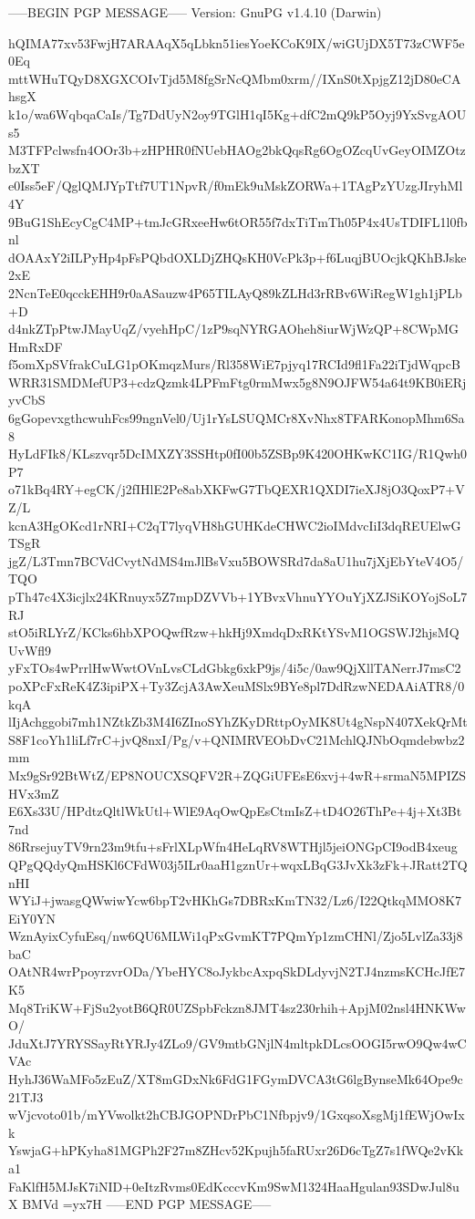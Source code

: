 -----BEGIN PGP MESSAGE-----
Version: GnuPG v1.4.10 (Darwin)

hQIMA77xv53FwjH7ARAAqX5qLbkn51iesYoeKCoK9IX/wiGUjDX5T73zCWF5e0Eq
mttWHuTQyD8XGXCOIvTjd5M8fgSrNcQMbm0xrm//IXnS0tXpjgZ12jD80eCAhsgX
k1o/wa6WqbqaCaIs/Tg7DdUyN2oy9TGlH1qI5Kg+dfC2mQ9kP5Oyj9YxSvgAOUs5
M3TFPclwsfn4OOr3b+zHPHR0fNUebHAOg2bkQqsRg6OgOZcqUvGeyOIMZOtzbzXT
e0Iss5eF/QglQMJYpTtf7UT1NpvR/f0mEk9uMskZORWa+1TAgPzYUzgJIryhMl4Y
9BuG1ShEcyCgC4MP+tmJcGRxeeHw6tOR55f7dxTiTmTh05P4x4UsTDIFL1l0fbnl
dOAAxY2iILPyHp4pFsPQbdOXLDjZHQsKH0VcPk3p+f6LuqjBUOcjkQKhBJske2xE
2NcnTeE0qcckEHH9r0aASauzw4P65TILAyQ89kZLHd3rRBv6WiRegW1gh1jPLb+D
d4nkZTpPtwJMayUqZ/vyehHpC/1zP9sqNYRGAOheh8iurWjWzQP+8CWpMGHmRxDF
f5omXpSVfrakCuLG1pOKmqzMurs/Rl358WiE7pjyq17RCId9fl1Fa22iTjdWqpcB
WRR31SMDMefUP3+cdzQzmk4LPFmFtg0rmMwx5g8N9OJFW54a64t9KB0iERjyvCbS
6gGopevxgthcwuhFcs99ngnVel0/Uj1rYsLSUQMCr8XvNhx8TFARKonopMhm6Sa8
HyLdFIk8/KLszvqr5DcIMXZY3SSHtp0fI00b5ZSBp9K420OHKwKC1IG/R1Qwh0P7
o71kBq4RY+egCK/j2fIHlE2Pe8abXKFwG7TbQEXR1QXDI7ieXJ8jO3QoxP7+VZ/L
kcnA3HgOKcd1rNRI+C2qT7lyqVH8hGUHKdeCHWC2ioIMdvcIiI3dqREUElwGTSgR
jgZ/L3Tmn7BCVdCvytNdMS4mJlBsVxu5BOWSRd7da8aU1hu7jXjEbYteV4O5/TQO
pTh47c4X3icjlx24KRnuyx5Z7mpDZVVb+1YBvxVhnuYYOuYjXZJSiKOYojSoL7RJ
stO5iRLYrZ/KCks6hbXPOQwfRzw+hkHj9XmdqDxRKtYSvM1OGSWJ2hjsMQUvWfl9
yFxTOs4wPrrlHwWwtOVnLvsCLdGbkg6xkP9js/4i5c/0aw9QjXllTANerrJ7msC2
poXPcFxReK4Z3ipiPX+Ty3ZcjA3AwXeuMSlx9BYe8pl7DdRzwNEDAAiATR8/0kqA
lIjAchggobi7mh1NZtkZb3M4I6ZInoSYhZKyDRttpOyMK8Ut4gNspN407XekQrMt
S8F1coYh1liLf7rC+jvQ8nxI/Pg/v+QNIMRVEObDvC21MchlQJNbOqmdebwbz2mm
Mx9gSr92BtWtZ/EP8NOUCXSQFV2R+ZQGiUFEsE6xvj+4wR+srmaN5MPIZSHVx3mZ
E6Xs33U/HPdtzQltlWkUtl+WlE9AqOwQpEsCtmIsZ+tD4O26ThPe+4j+Xt3Bt7nd
86RrsejuyTV9rn23m9tfu+sFrlXLpWfn4HeLqRV8WTHjl5jeiONGpCI9odB4xeug
QPgQQdyQmHSKl6CFdW03j5ILr0aaH1gznUr+wqxLBqG3JvXk3zFk+JRatt2TQnHI
WYiJ+jwasgQWwiwYcw6bpT2vHKhGs7DBRxKmTN32/Lz6/I22QtkqMMO8K7EiY0YN
WznAyixCyfuEsq/nw6QU6MLWi1qPxGvmKT7PQmYp1zmCHNl/Zjo5LvlZa33j8baC
OAtNR4wrPpoyrzvrODa/YbeHYC8oJykbcAxpqSkDLdyvjN2TJ4nzmsKCHcJfE7K5
Mq8TriKW+FjSu2yotB6QR0UZSpbFckzn8JMT4sz230rhih+ApjM02nsl4HNKWwO/
JduXtJ7YRYSSayRtYRJy4ZLo9/GV9mtbGNjlN4mltpkDLcsOOGI5rwO9Qw4wCVAc
HyhJ36WaMFo5zEuZ/XT8mGDxNk6FdG1FGymDVCA3tG6lgBynseMk64Ope9c21TJ3
wVjcvoto01b/mYVwolkt2hCBJGOPNDrPbC1Nfbpjv9/1GxqsoXsgMj1fEWjOwIxk
YswjaG+hPKyha81MGPh2F27m8ZHcv52Kpujh5faRUxr26D6cTgZ7s1fWQe2vKka1
FaKlfH5MJsK7iNID+0eItzRvms0EdKcccvKm9SwM1324HaaHgulan93SDwJul8uX
BMVd
=yx7H
-----END PGP MESSAGE-----
